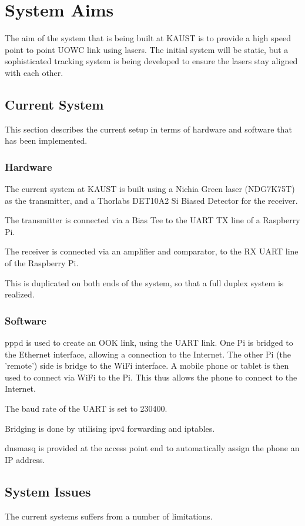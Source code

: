 \section{System Aims}
The aim of the system that is being built at \ac{KAUST} is to provide a high
speed point to point \ac{UOWC} link using lasers. The initial system will be
static, but a sophisticated tracking system is being developed to ensure the
lasers stay aligned with each other.

\subsection{Current System}
This section describes the current setup in terms of hardware and software
that has been implemented.

\subsubsection{Hardware}
The current system at \ac{KAUST} is built using a Nichia Green laser (NDG7K75T)
as the transmitter, and a Thorlabs DET10A2 Si Biased Detector for the receiver.

The transmitter is connected via a Bias Tee  to
the \ac{UART} TX line of a Raspberry Pi.

The receiver is connected via an amplifier and comparator, to the RX UART
line of the Raspberry Pi.

This is duplicated on both ends of the system, so that a full duplex
system is realized.

\subsubsection{Software}
pppd is used to create an OOK link, using the \ac{UART} link. One Pi is
bridged to the Ethernet interface, allowing a connection to the Internet.
The other Pi (the 'remote') side is bridge to the WiFi interface. A mobile
phone or tablet is then used to connect via WiFi to the Pi. This thus allows
the phone to connect to the Internet.

The baud rate of the \ac{UART} is set to 230400.

Bridging is done by utilising ipv4 forwarding and iptables.

dnsmasq is provided at the access point end to automatically assign the phone
an IP address.

\subsection{System Issues}
The current systems suffers from a number of limitations.

